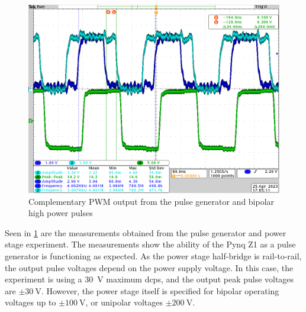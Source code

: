\begin{figure}[htbp]
	\centering
	\includegraphics[width=.8\textwidth]{Figures/5_controlsystem_fpga_pwm.png}
	\caption{Complementary PWM output from the pulse generator and bipolar high power pulses}
	\label{fig:5_pulse_generator_experiment}
\end{figure}

Seen in \cref{fig:5_pulse_generator_experiment} are the measurements obtained from the pulse generator and power stage experiment. The measurements show the ability of the Pynq Z1 as a pulse generator is functioning as expected. As the power stage half-bridge is rail-to-rail, the output pulse voltages depend on the power supply voltage. In this case, the experiment is using a \qty{30}{\volt} maximum \gls{dcps}, and the output peak pulse voltages are $\pm \qty{30}{\volt}$. However, the power stage itself is specified for bipolar operating voltages up to $\pm \qty{100}{\volt}$, or unipolar voltages $\pm \qty{200}{\volt}$.

